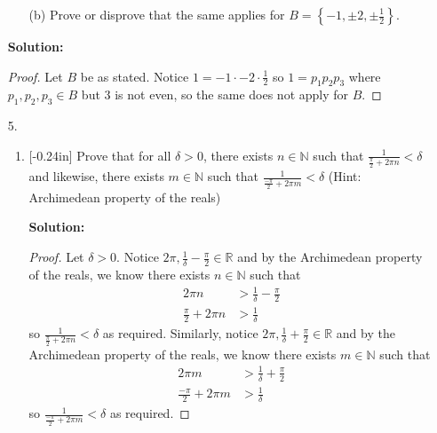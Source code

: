 \documentclass[letterpaper,12pt]{article}
\newcommand{\set}[1]{\left\{ #1 \right\}}
\theoremstyle{definition}
\begin{document}
\pagebreak
\begin{enumerate}
    \item[] \begin{enumerate}
        \item[(b)] Prove or disprove that the same applies for $B = \set{-1, \pm 2, \pm \frac{1}{2}}$.
    \end{enumerate}
    \begin{mdframed}
        \textbf{Solution:}
        \renewcommand{\proofname}{Disproof}
        \begin{proof}
            Let $B$ be as stated. Notice $1 = -1 \cdot -2 \cdot \frac{1}{2}$ so $1 = p_1p_2p_3$ where $p_1,p_2,p_3 \in B$ but $3$ is not even, so the same does not apply for $B$.
        \end{proof}
    \end{mdframed}
\end{enumerate}
\pagebreak
\begin{enumerate}
       \item[5.]  \begin{enumerate}
        \item \reversemarginpar{}[-0.24in] Prove that for all $\delta > 0$, there exists $n \in \mathbb{N}$ such that $\frac{1}{\frac{\pi}{2}+2\pi n} < \delta$ and likewise, there exists $m \in \mathbb{N}$ such that  $\frac{1}{\frac{-\pi}{2}+2\pi m} < \delta$ (Hint: Archimedean property of the reals)
    \begin{mdframed}
        \textbf{Solution:}
        \begin{proof}
           Let $\delta > 0$. Notice $2\pi , \frac{1}{\delta} - \frac{\pi}{2} \in \mathbb{R}$ and by the Archimedean property of the reals, we know there exists $n \in \mathbb{N}$ such that \begin{align*}
               2\pi n &> \frac{1}{\delta} - \frac{\pi}{2} \\
             \frac{\pi}{2} + 2\pi n &> \frac{1}{\delta} 
           \end{align*}
           so $\frac{1}{\frac{\pi}{2}+2\pi n} < \delta$ as required. Similarly, notice $2\pi , \frac{1}{\delta} + \frac{\pi}{2} \in \mathbb{R}$ and by the Archimedean property of the reals, we know there exists $m \in \mathbb{N}$ such that \begin{align*}
               2\pi m &> \frac{1}{\delta} + \frac{\pi}{2} \\
             \frac{-\pi}{2} + 2\pi m &> \frac{1}{\delta} 
           \end{align*}
           so $\frac{1}{\frac{-\pi}{2}+2\pi m} < \delta$ as required. 
        \end{proof}
    \end{mdframed}
    \end{enumerate}
\end{enumerate}
\end{document}
